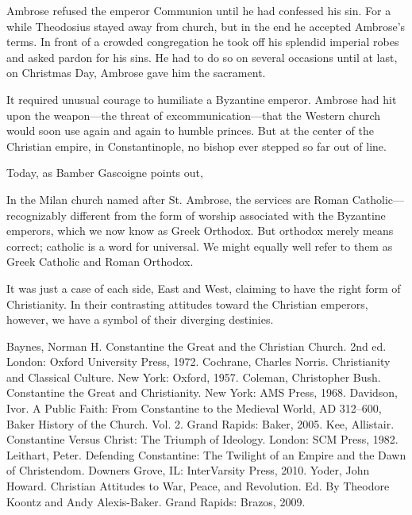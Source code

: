 Ambrose refused the emperor Communion until he had confessed his sin. For a while Theodosius stayed
away from church, but in the end he accepted Ambrose’s terms. In front of a crowded congregation he
took off his splendid imperial robes and asked pardon for his sins. He had to do so on several
occasions until at last, on Christmas Day, Ambrose gave him the sacrament.

It required unusual courage to humiliate a Byzantine emperor. Ambrose had hit upon the weapon—the
threat of excommunication—that the Western church would soon use again and again to humble princes.
But at the center of the Christian empire, in Constantinople, no bishop ever stepped so far out of
line.

Today, as Bamber Gascoigne points out,

\begin{blockquote}
In the Milan church named after St. Ambrose, the services are Roman Catholic—recognizably different
from the form of worship associated with the Byzantine emperors, which we now know as Greek
Orthodox. But orthodox merely means correct; catholic is a word for universal. We might equally well
refer to them as Greek Catholic and Roman Orthodox.
\end{blockquote}

\noindent It was just a case of each side, East and West, claiming to have the right form of
Christianity. In their contrasting attitudes toward the Christian emperors, however, we have a
symbol of their diverging destinies.

\begin{readinglist}
\entry Baynes, Norman H. Constantine the Great and the Christian Church. 2nd ed. London: Oxford
  University Press, 1972.
\entry Cochrane, Charles Norris. Christianity and Classical Culture. New York: Oxford, 1957.
\entry Coleman, Christopher Bush. Constantine the Great and Christianity. New York: AMS Press, 1968.
\entry Davidson, Ivor. A Public Faith: From Constantine to the Medieval World, AD 312–600, Baker
  History of the Church. Vol. 2. Grand Rapids: Baker, 2005.
\entry Kee, Allistair. Constantine Versus Christ: The Triumph of Ideology. London: SCM Press, 1982.
\entry *Leithart, Peter. Defending Constantine: The Twilight of an Empire and the Dawn of
  Christendom. Downers Grove, IL: InterVarsity Press, 2010.
\entry *Yoder, John Howard. Christian Attitudes to War, Peace, and Revolution. Ed. By Theodore
  Koontz and Andy Alexis-Baker. Grand Rapids: Brazos, 2009.
\end{readinglist}
